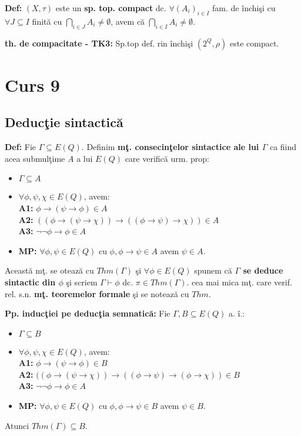\documentclass{article}
\begin{document}
\textbf{Def:} $(X,\tau)$ este un \textbf{sp. top. compact} dc. $\forall (A_i)_{i\in I}$ fam. de \^ inchi\c si cu $\forall J\subseteq I$ finit\u a cu $\bigcap_{i\in J}A_i\neq\emptyset$, avem c\u a  $\bigcap_{i\in I}A_i\neq \emptyset$.

\textbf{th. de compacitate - TK3:} Sp.top def. rin \^ inchi\c si $(2^Q,\rho)$ este compact.

\section{Curs 9}

\subsection{Deduc\c tie sintactic\u a}

\textbf{Def:} Fie $\Gamma\subseteq E(Q)$. Definim \textbf{m\c t. consecin\c telor sintactice ale lui $\Gamma$} ca fiind acea submul\c time $A$ a lui $E(Q)$ care verific\u a urm. prop:
\begin{itemize}
    \item $\Gamma\subseteq A$
    \item $\forall\phi,\psi,\chi\in E(Q)$, avem:\\
    \textbf{A1:} $\phi\rightarrow(\psi\rightarrow\phi)\in A$\\
    \textbf{A2:} $((\phi\rightarrow(\psi\rightarrow\chi))\rightarrow((\phi\rightarrow\psi)\rightarrow\chi))\in A$\\
    \textbf{A3:} $\neg\neg\phi\rightarrow\phi\in A$
    \item \textbf{MP:} $\forall\phi,\psi\in E(Q)$ cu $\phi,\phi\rightarrow\psi\in A$ avem $\psi\in A$.
\end{itemize}
Aceast\u a m\c t. se oteaz\u a cu $Thm(\Gamma)$ \c si $\forall\phi\in E(Q)$ spunem c\u a \textbf{$\Gamma$ se deduce sintactic din $\phi$} \c si scriem $\Gamma\vdash\phi$ dc. $\pi\in Thm(\Gamma)$. cea mai mica m\c t. care verif. rel. s.n. \textbf{m\c t. teoremelor formale} \c si se noteaz\u a cu $Thm$.

\textbf{Pp. induc\c tiei pe deduc\c tia semnatic\u a:} Fie $\Gamma,B\subseteq E(Q)$ a. \^ i.:
\begin{itemize}
    \item $\Gamma\subseteq B$
    \item $\forall\phi,\psi,\chi\in E(Q)$, avem:\\
    \textbf{A1:} $\phi\rightarrow(\psi\rightarrow\phi)\in B$\\
    \textbf{A2:} $((\phi\rightarrow(\psi\rightarrow\chi))\rightarrow((\phi\rightarrow\psi)\rightarrow(\phi\rightarrow\chi))\in B$\\
    \textbf{A3:} $\neg\neg\phi\rightarrow\phi\in A$
    \item \textbf{MP:} $\forall\phi,\psi\in E(Q)$ cu $\phi,\phi\rightarrow\psi\in B$ avem $\psi\in B$.
\end{itemize}
Atunci $Thm(\Gamma)\subseteq B$.
\end{document}
